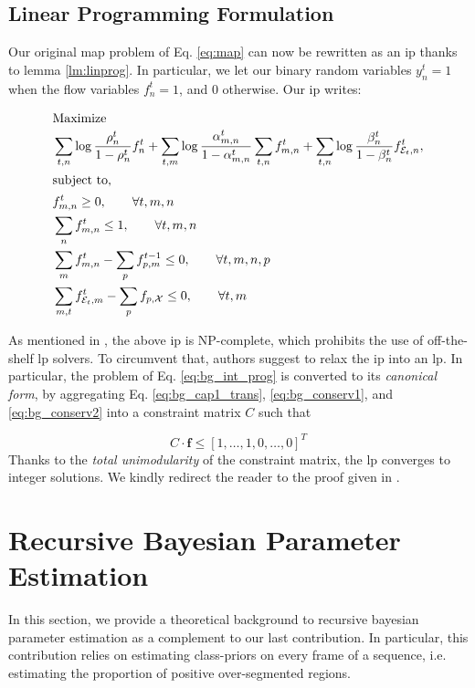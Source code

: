 \subsection{Linear Programming Formulation}
Our original \gls{map} problem of Eq. \ref{eq:map} can now be rewritten as an \gls{ip} thanks to lemma \ref{lm:linprog}.
In particular, we let our binary random variables $y^{t}_{n}=1$ when the flow variables $f^{t}_{n}=1$, and $0$ otherwise.
Our \gls{ip} writes:

\begin{subequations}
\label{eq:bg_int_prog}
\begin{align}
\intertext{Maximize}
&\sum_{t,n} \log{\frac{\rho_n^t}{1-\rho_n^t}}f_n^t + \sum_{t,m} \log{\frac{\alpha_{m,n}^{t}}{1-\alpha_{m,n}^{t}}}\sum_{t,n}f_{m,n}^{t} + \sum_{t,n} \log{\frac{\beta_n^t}{1-\beta_n^t}}f_{\mathcal{E}_t,n}^{t},\label{eq:bg_loglikelihood}\\
\intertext{subject to,}
&f_{m,n}^{t} \geq 0, \qquad \forall t,m,n \label{eq:nonneg_flow}\\
&\sum\limits_{n}f_{m,n}^{t} \leq 1, \qquad \forall t,m,n \label{eq:bg_cap1_trans}\\
&\sum_m f_{m,n}^{t} - \sum_p f^{t-1}_{p,m} \leq 0, \qquad \forall t,m,n,p \label{eq:bg_conserv1}\\
&\sum_{m,t} f^t_{\mathcal{E}_t,m} - \sum_p f_{p,\mathcal{X}} \leq 0, \qquad \forall t,m\label{eq:bg_conserv2}
\end{align}
\end{subequations}

As mentioned in \cite{berclaz11}, the above \gls{ip} is NP-complete, which prohibits the use of off-the-shelf \gls{lp} solvers.
To circumvent that, authors suggest to relax the \gls{ip} into an \gls{lp}.
In particular, the problem of Eq. \ref{eq:bg_int_prog} is converted to its \textit{canonical form}, by aggregating Eq. \ref{eq:bg_cap1_trans}, \ref{eq:bg_conserv1}, and \ref{eq:bg_conserv2} into a constraint matrix $C$ such that

\begin{equation}
  C \cdot \bm{f} \leq [1, \ldots, 1, 0, \ldots, 0]^{T}
\end{equation}
Thanks to the  \textit{total unimodularity} of the constraint matrix, the \gls{lp} converges to integer solutions.
We kindly redirect the reader to the proof given in \cite{berclaz11}.

\section{Recursive Bayesian Parameter Estimation}
In this section, we provide a theoretical background to recursive bayesian parameter estimation as a complement to our last contribution.
In particular, this contribution relies on estimating class-priors on every frame of a sequence, i.e. estimating the proportion of positive over-segmented regions.

